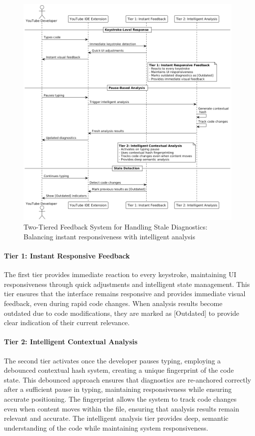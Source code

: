 \begin{spacing}{1.2}
\begin{figure}[H]
\centering
\includegraphics[scale=0.6]{images/stale_diagnostics.png}
\caption{Two-Tiered Feedback System for Handling Stale Diagnostics: Balancing instant responsiveness with intelligent analysis}
\label{fig:two_tiered_feedback}
\end{figure}

\paragraph{Tier 1: Instant Responsive Feedback}
The first tier provides immediate reaction to every keystroke, maintaining UI responsiveness through quick adjustments and intelligent state management. This tier ensures that the interface remains responsive and provides immediate visual feedback, even during rapid code changes. When analysis results become outdated due to code modifications, they are marked as [Outdated] to provide clear indication of their current relevance.

\paragraph{Tier 2: Intelligent Contextual Analysis}
The second tier activates once the developer pauses typing, employing a debounced contextual hash system, creating a unique fingerprint of the code state. This debounced approach ensures that diagnostics are re-anchored correctly after a sufficient pause in typing, maintaining responsiveness while ensuring accurate positioning. The fingerprint allows the system to track code changes even when content moves within the file, ensuring that analysis results remain relevant and accurate. The intelligent analysis tier provides deep, semantic understanding of the code while maintaining system responsiveness.


\end{spacing}
